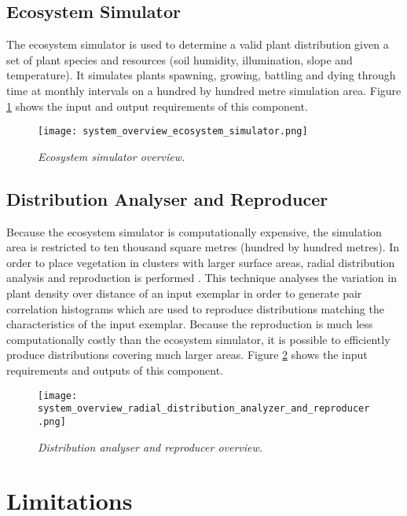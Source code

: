 \subsection{Ecosystem Simulator}

The ecosystem simulator is used to determine a valid plant distribution given a set of plant species and resources (soil humidity, illumination, slope and temperature). It simulates plants spawning, growing, battling and dying through time at monthly intervals on a hundred by hundred metre simulation area. Figure \ref{fig:system_overview_ecosystem_simulator} shows the input and output requirements of this component.

\begin{figure}
\center
	\texttt{[image: system\_overview\_ecosystem\_simulator.png]}
	\caption{ \textit{Ecosystem simulator overview.}}	
	\label{fig:system_overview_ecosystem_simulator}
\end{figure}

\subsection{Distribution Analyser and Reproducer}

Because the ecosystem simulator is computationally expensive, the simulation area is restricted to ten thousand square metres (hundred by hundred metres). In order to place vegetation in clusters with larger surface areas, radial distribution analysis and reproduction is performed \cite{Emilien,Boudon2007,Lane2002}. This technique analyses the variation in plant density over distance of an input exemplar in order to generate pair correlation histograms which are used to reproduce distributions matching the characteristics of the input exemplar. Because the reproduction is much less computationally costly than the ecosystem simulator, it is possible to efficiently produce distributions covering much larger areas. Figure \ref{fig:system_overview_distribution_analyser_and_reproducer} shows the input requirements and outputs of this component.

\begin{figure}
\center
	\texttt{[image: system\_overview\_radial\_distribution\_analyzer\_and\_reproducer.png]}
	\caption{ \textit{Distribution analyser and reproducer overview.}}	
	\label{fig:system_overview_distribution_analyser_and_reproducer}
\end{figure}

\section{Limitations}

